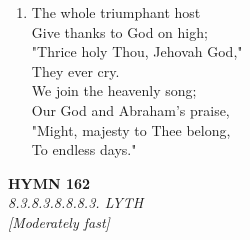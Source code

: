 \documentclass[11pt,a4paper]{article}
\begin{document}
\begin{enumerate}
    \item The whole triumphant host \\
        Give thanks to God on high; \\
        "Thrice holy Thou, Jehovah God," \\
        They ever cry. \\
        We join the heavenly song; \\
        Our God and Abraham's praise, \\
        "Might, majesty to Thee belong, \\
        To endless days."

\end{enumerate}

\newpage
\begin{center}
    {\Large \textbf{HYMN 162}}
    \\
    \textit{8.3.8.3.8.8.8.3. LYTH}
    \\
    \textit{\small [Moderately fast]}
\end{center}
\vspace{1em}
\end{document}

